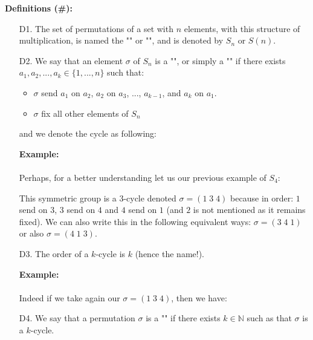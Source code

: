 	 \textbf{Definitions (\#\mydef):}
	 \begin{enumerate}
		\item[D1.] The set of permutations of a set with $n$ elements, with this structure of multiplication, is named the "" or "", and is denoted by $S_n$ or $S(n)$.
		
		\item[D2.] We say that an element $\sigma$  of $S_n$ is a "", or simply a "" if there exists $a_1,a_2,...,a_k\in \{1,...,n\}$ such that:
		\begin{itemize}
			\item $\sigma$ send $a_1$ on $a_2$, $a_2$ on $a_3$, ..., $a_{k-1}$, and $a_k$ on $a_1$.

			\item $\sigma$ fix all other elements of $S_n$
		\end{itemize}
		and we denote the cycle as following:
		
		\begin{tcolorbox}[colframe=black,colback=white,sharp corners]
		\textbf{{\Large {}}Example:}\\\\
		Perhaps, for a better understanding let us our previous example of $S_4$:
		
		This symmetric group is a $3$-cycle denoted $\sigma=(1\; 3\; 4)$ because in order: $1$ send on $3$, $3$ send on $4$ and $4$ send on $1$ (and $2$ is not mentioned as it remains fixed). We can also write this in the following equivalent ways: $\sigma=(3\; 4\; 1)$ or also $\sigma=(4\; 1\; 3)$.
		\end{tcolorbox}

		\item[D3.] The order of a $k$-cycle is $k$ (hence the name!).
		\begin{tcolorbox}[colframe=black,colback=white,sharp corners]
		\textbf{{\Large {}}Example:}\\\\
		Indeed if we take again our $\sigma=(1\; 3\; 4)$, then we have:
		
		\end{tcolorbox}

		\item[D4.] We say that a permutation $\sigma$ is a "" if there exists $k\in \mathbb{N}$ such as that $\sigma$ is a $k$-cycle.
		

\end{enumerate}
